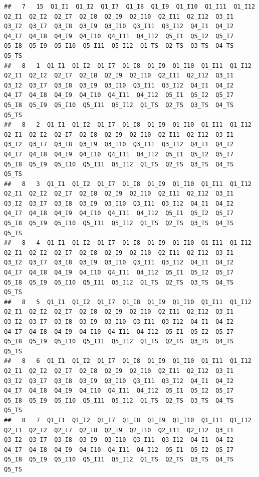 \documentclass[
]{book}
\begin{document}
\begin{verbatim}
##   7   15  Q1_I1  Q1_I2  Q1_I7  Q1_I8  Q1_I9  Q1_I10  Q1_I11  Q1_I12  Q2_I1  Q2_I2  Q2_I7  Q2_I8  Q2_I9  Q2_I10  Q2_I11  Q2_I12  Q3_I1  Q3_I2  Q3_I7  Q3_I8  Q3_I9  Q3_I10  Q3_I11  Q3_I12  Q4_I1  Q4_I2  Q4_I7  Q4_I8  Q4_I9  Q4_I10  Q4_I11  Q4_I12  Q5_I1  Q5_I2  Q5_I7  Q5_I8  Q5_I9  Q5_I10  Q5_I11  Q5_I12  Q1_TS  Q2_TS  Q3_TS  Q4_TS  Q5_TS
##   8   1  Q1_I1  Q1_I2  Q1_I7  Q1_I8  Q1_I9  Q1_I10  Q1_I11  Q1_I12  Q2_I1  Q2_I2  Q2_I7  Q2_I8  Q2_I9  Q2_I10  Q2_I11  Q2_I12  Q3_I1  Q3_I2  Q3_I7  Q3_I8  Q3_I9  Q3_I10  Q3_I11  Q3_I12  Q4_I1  Q4_I2  Q4_I7  Q4_I8  Q4_I9  Q4_I10  Q4_I11  Q4_I12  Q5_I1  Q5_I2  Q5_I7  Q5_I8  Q5_I9  Q5_I10  Q5_I11  Q5_I12  Q1_TS  Q2_TS  Q3_TS  Q4_TS  Q5_TS
##   8   2  Q1_I1  Q1_I2  Q1_I7  Q1_I8  Q1_I9  Q1_I10  Q1_I11  Q1_I12  Q2_I1  Q2_I2  Q2_I7  Q2_I8  Q2_I9  Q2_I10  Q2_I11  Q2_I12  Q3_I1  Q3_I2  Q3_I7  Q3_I8  Q3_I9  Q3_I10  Q3_I11  Q3_I12  Q4_I1  Q4_I2  Q4_I7  Q4_I8  Q4_I9  Q4_I10  Q4_I11  Q4_I12  Q5_I1  Q5_I2  Q5_I7  Q5_I8  Q5_I9  Q5_I10  Q5_I11  Q5_I12  Q1_TS  Q2_TS  Q3_TS  Q4_TS  Q5_TS
##   8   3  Q1_I1  Q1_I2  Q1_I7  Q1_I8  Q1_I9  Q1_I10  Q1_I11  Q1_I12  Q2_I1  Q2_I2  Q2_I7  Q2_I8  Q2_I9  Q2_I10  Q2_I11  Q2_I12  Q3_I1  Q3_I2  Q3_I7  Q3_I8  Q3_I9  Q3_I10  Q3_I11  Q3_I12  Q4_I1  Q4_I2  Q4_I7  Q4_I8  Q4_I9  Q4_I10  Q4_I11  Q4_I12  Q5_I1  Q5_I2  Q5_I7  Q5_I8  Q5_I9  Q5_I10  Q5_I11  Q5_I12  Q1_TS  Q2_TS  Q3_TS  Q4_TS  Q5_TS
##   8   4  Q1_I1  Q1_I2  Q1_I7  Q1_I8  Q1_I9  Q1_I10  Q1_I11  Q1_I12  Q2_I1  Q2_I2  Q2_I7  Q2_I8  Q2_I9  Q2_I10  Q2_I11  Q2_I12  Q3_I1  Q3_I2  Q3_I7  Q3_I8  Q3_I9  Q3_I10  Q3_I11  Q3_I12  Q4_I1  Q4_I2  Q4_I7  Q4_I8  Q4_I9  Q4_I10  Q4_I11  Q4_I12  Q5_I1  Q5_I2  Q5_I7  Q5_I8  Q5_I9  Q5_I10  Q5_I11  Q5_I12  Q1_TS  Q2_TS  Q3_TS  Q4_TS  Q5_TS
##   8   5  Q1_I1  Q1_I2  Q1_I7  Q1_I8  Q1_I9  Q1_I10  Q1_I11  Q1_I12  Q2_I1  Q2_I2  Q2_I7  Q2_I8  Q2_I9  Q2_I10  Q2_I11  Q2_I12  Q3_I1  Q3_I2  Q3_I7  Q3_I8  Q3_I9  Q3_I10  Q3_I11  Q3_I12  Q4_I1  Q4_I2  Q4_I7  Q4_I8  Q4_I9  Q4_I10  Q4_I11  Q4_I12  Q5_I1  Q5_I2  Q5_I7  Q5_I8  Q5_I9  Q5_I10  Q5_I11  Q5_I12  Q1_TS  Q2_TS  Q3_TS  Q4_TS  Q5_TS
##   8   6  Q1_I1  Q1_I2  Q1_I7  Q1_I8  Q1_I9  Q1_I10  Q1_I11  Q1_I12  Q2_I1  Q2_I2  Q2_I7  Q2_I8  Q2_I9  Q2_I10  Q2_I11  Q2_I12  Q3_I1  Q3_I2  Q3_I7  Q3_I8  Q3_I9  Q3_I10  Q3_I11  Q3_I12  Q4_I1  Q4_I2  Q4_I7  Q4_I8  Q4_I9  Q4_I10  Q4_I11  Q4_I12  Q5_I1  Q5_I2  Q5_I7  Q5_I8  Q5_I9  Q5_I10  Q5_I11  Q5_I12  Q1_TS  Q2_TS  Q3_TS  Q4_TS  Q5_TS
##   8   7  Q1_I1  Q1_I2  Q1_I7  Q1_I8  Q1_I9  Q1_I10  Q1_I11  Q1_I12  Q2_I1  Q2_I2  Q2_I7  Q2_I8  Q2_I9  Q2_I10  Q2_I11  Q2_I12  Q3_I1  Q3_I2  Q3_I7  Q3_I8  Q3_I9  Q3_I10  Q3_I11  Q3_I12  Q4_I1  Q4_I2  Q4_I7  Q4_I8  Q4_I9  Q4_I10  Q4_I11  Q4_I12  Q5_I1  Q5_I2  Q5_I7  Q5_I8  Q5_I9  Q5_I10  Q5_I11  Q5_I12  Q1_TS  Q2_TS  Q3_TS  Q4_TS  Q5_TS

\end{verbatim}
\end{document}
